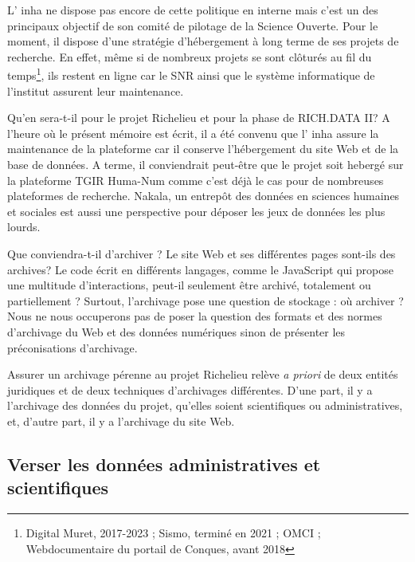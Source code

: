 L' \acrshort{inha} ne dispose pas encore de cette politique en interne mais c'est un des principaux objectif de son comité de pilotage de la Science Ouverte. Pour le moment, il dispose d'une stratégie d'hébergement à long terme de ses projets de recherche. En effet, même si de nombreux projets se sont clôturés au fil du temps\footnote{Digital Muret, 2017-2023 ; Sismo, terminé en 2021 ; OMCI ; Webdocumentaire du portail de Conques, avant 2018}, ils restent en ligne car le SNR ainsi que le système informatique de l'institut assurent leur maintenance.  

Qu'en sera-t-il pour le projet Richelieu et pour la phase de RICH.DATA II? A l'heure où le présent mémoire est écrit, il a été convenu que l' \acrshort{inha} assure la maintenance de la plateforme car il conserve l'hébergement du site Web et de la base de données. A terme, il conviendrait peut-être que le projet soit hebergé sur la plateforme TGIR Huma-Num comme c'est déjà le cas pour de nombreuses plateformes de recherche. Nakala, un entrepôt des données en sciences humaines et sociales est aussi une perspective pour déposer les jeux de données les plus lourds.  

Que conviendra-t-il d'archiver ? Le site Web et ses différentes pages sont-ils des archives? Le code écrit en différents langages, comme le JavaScript qui propose une multitude d'interactions, peut-il seulement être archivé, totalement ou partiellement ? Surtout, l'archivage pose une question de stockage : où archiver ? Nous ne nous occuperons pas de poser la question des formats et des normes d'archivage du Web et des données numériques sinon de présenter les préconisations d'archivage. 

Assurer un archivage pérenne au projet Richelieu relève \textit{a priori} de deux entités juridiques et de deux techniques d'archivages différentes. D'une part, il y a l'archivage des données du projet, qu'elles soient scientifiques ou administratives, et, d'autre part, il y a l'archivage du site Web. 

\subsection{Verser les données administratives et scientifiques}

